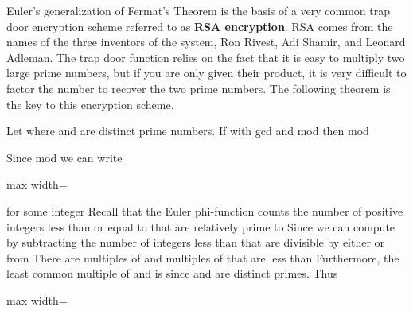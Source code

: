 \documentclass[11pt,oneside]{article}
\begin{document}
\begin{BookBody}


\noindent Euler’s generalization of Fermat’s Theorem is the basis of a very common trap door encryption scheme referred to as\textbf{ RSA encryption}. RSA comes from the names of the three inventors of the system, Ron Rivest, Adi Shamir, and Leonard Adleman. The trap door function relies on the fact that it is easy to multiply two large prime numbers, but if you are only given their product, it is very difficult to factor the number to recover the two prime numbers. The following theorem is the key to this encryption scheme.

 Let  where  and  are distinct prime numbers. If  with gcd and mod  then mod 

 Since mod  we can write

\begin{center}\begin{adjustbox}{max width=\linewidth}\end{adjustbox}\end{center}

\noindent for some integer  Recall that the Euler phi-function  counts the number of positive integers less than or equal to  that are relatively prime to  Since  we can compute  by subtracting the number of integers less than  that are divisible by either  or  from  There are  multiples of  and  multiples of  that are less than  Furthermore, the least common multiple of  and  is  since  and  are distinct primes. Thus

\begin{center}\begin{adjustbox}{max width=\linewidth}\end{adjustbox}\end{center}


\end{BookBody}
\end{document}
